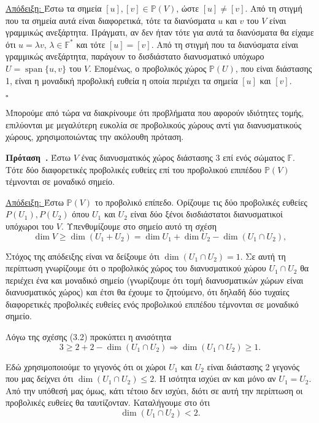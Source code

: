 \documentclass[12pt, a4paper]{book}
\newcounter{sentence}[section]
\newenvironment{sentence}[1][]{\refstepcounter{sentence}\par\medskip
   \textbf{Πρόταση~\thesentence. #1} \rmfamily}{\medskip}
\DeclareMathOperator{\Span}{span}
\begin{document}
\underline{Απόδειξη: } Έστω τα σημεία $[u], [v] \in \mathbb{P}(V)$, ώστε $[u] \neq [v]$. Από τη στιγμή που τα σημεία αυτά είναι διαφορετικά, τότε τα διανύσματα $u$ και $v$ του $V$ είναι γραμμικώς ανεξάρτητα. Πράγματι, αν δεν ήταν τότε για αυτά τα διανύσματα θα είχαμε ότι $u  = λv,\, λ \in \mathbb{F}^*$ και τότε $[u] = [v]$. Από τη στιγμή που τα διανύσματα είναι γραμμικώς ανεξάρτητα, παράγουν το δισδιάστατο διανυσματικό υπόχωρο $U= \Span\{u,v\}$ του $V$. Επομένως, ο προβολικός χώρος $\mathbb{P}(U)$, που είναι διάστασης 1, είναι η μοναδική προβολική ευθεία η οποία περιέχει τα σημεία $[u]$ και $[v]$.
	\begin{flushright}
	$\square$
	\end{flushright}

Μπορούμε από τώρα να διακρίνουμε ότι προβλήματα που αφορούν ιδιότητες τομής, επιλύονται με μεγαλύτερη ευκολία σε προβολικούς χώρους αντί για διανυσματικούς χώρους, χρησιμοποιώντας την ακόλουθη πρόταση.

\begin{sentence}
Έστω $V$ ένας διανυσματικός χώρος διάστασης 3 επί ενός σώματος $\mathbb{F}$. Τότε δύο διαφορετικές προβολικές ευθείες επί του προβολικού επιπέδου $\mathbb{P}(V)$ τέμνονται σε μοναδικό σημείο.
\end{sentence}

\underline{Απόδειξη: } Έστω $\mathbb{P}(V)$ το προβολικό επίπεδο. Ορίζουμε τις δύο προβολικές ευθείες $P(U_1), P(U_2)$ όπου $U_1$ και $U_2$ είναι δύο ξένοι δισδιάστατοι διανυσματικοί υπόχωροι του $V$. Υπενθυμίζουμε στο σημείο αυτό τη σχέση
\begin{equation}
\dim{V} \geqslant \dim{(U_1 + U_2)} = \dim{U_1} + \dim{U_2} - \dim{(U_1 \cap U_2)},
\end{equation} 

Στόχος της απόδειξης είναι να δείξουμε ότι $\dim{(U_1 \cap U_2)} = 1$. Σε αυτή τη περίπτωση γνωρίζουμε ότι ο προβολικός χώρος του διανυσματικού χώρου $U_1 \cap U_2$ θα περιέχει ένα και μοναδικό σημείο (γνωρίζουμε ότι τομή διανυσματικών χώρων είναι διανυσματικός χώρος) και έτσι θα έχουμε το ζητούμενο, ότι δηλαδή δύο τυχαίες διαφορετικές προβολικές ευθείες ενός προβολικού επιπέδου τέμνονται σε μοναδικό σημείο.

Λόγω της σχέσης (3.2) προκύπτει η ανισότητα
\begin{equation}
3 \geqslant 2 +2 - \dim{(U_1 \cap U_2)} \Rightarrow
\dim{(U_1 \cap U_2)} \geqslant 1.
\end{equation} 

Εδώ χρησιμοποιούμε το γεγονός ότι οι χώροι $U_1$ και $U_2$ είναι διάστασης 2 γεγονός που μας δείχνει ότι $\dim{(U_1 \cap U_2)} \leq 2$. Η ισότητα ισχύει αν και μόνο αν $U_1 = U_2$. Από την υπόθεσή μας όμως, κάτι τέτοιο δεν ισχύει, διότι σε αυτή την περίπτωση οι προβολικές ευθείες θα ταυτίζονταν. Καταλήγουμε στο ότι 
\begin{equation}
\dim{(U_1 \cap U_2)} <  2.
\end{equation} 
\end{document}
